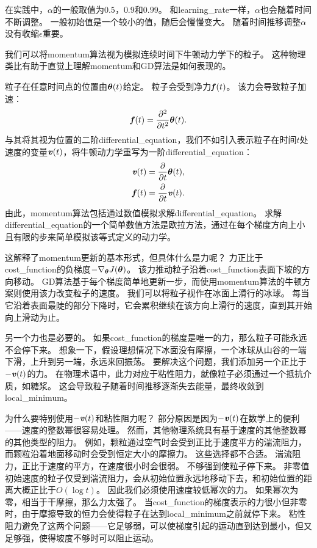 
在实践中，$\alpha$的一般取值为$0.5$，$0.9$和$0.99$。
和\gls{learning_rate}一样，$\alpha$也会随着时间不断调整。 
一般初始值是一个较小的值，随后会慢慢变大。
随着时间推移调整$\alpha$没有收缩$\epsilon$重要。


我们可以将\gls{momentum}算法视为模拟连续时间下牛顿动力学下的粒子。
这种物理类比有助于直觉上理解\gls{momentum}和\gls{GD}算法是如何表现的。


粒子在任意时间点的位置由$\boldsymbol{\theta}(t)$给定。
粒子会受到净力$\boldsymbol{\mathit{f}}(t)$。
该力会导致粒子加速：
\begin{equation}
    \boldsymbol{\mathit{f}}(t) = \frac{\partial^2}{\partial t^2} \boldsymbol{\theta}(t) .
\end{equation}
与其将其视为位置的二阶\gls{differential_equation}，我们不如引入表示粒子在时间$t$处速度的变量$\boldsymbol{\mathit{v}}(t)$，将牛顿动力学重写为一阶\gls{differential_equation}：
\begin{align}
    \boldsymbol{\mathit{v}}(t) &= \frac{\partial}{\partial t} \boldsymbol{\theta}(t) , \\
    \boldsymbol{\mathit{f}}(t) &= \frac{\partial}{\partial t} \boldsymbol{\mathit{v}}(t) .
\end{align}
由此，\gls{momentum}算法包括通过数值模拟求解\gls{differential_equation}。
求解\gls{differential_equation}的一个简单数值方法是欧拉方法，通过在每个梯度方向上小且有限的步来简单模拟该等式定义的动力学。


这解释了\gls{momentum}更新的基本形式，但具体什么是力呢？
力正比于\gls{cost_function}的负梯度$-\nabla_{\boldsymbol{\theta}} J(\boldsymbol{\theta})$。
该力推动粒子沿着\gls{cost_function}表面下坡的方向移动。
\gls{GD}算法基于每个梯度简单地更新一步，而使用\gls{momentum}算法的牛顿方案则使用该力改变粒子的速度。
我们可以将粒子视作在冰面上滑行的冰球。
每当它沿着表面最陡的部分下降时，它会累积继续在该方向上滑行的速度，直到其开始向上滑动为止。


另一个力也是必要的。
如果\gls{cost_function}的梯度是唯一的力，那么粒子可能永远不会停下来。
想象一下，假设理想情况下冰面没有摩擦，一个冰球从山谷的一端下滑，上升到另一端，永远来回振荡。
要解决这个问题，我们添加另一个正比于$-\boldsymbol{\mathit{v}}(t)$的力。
在物理术语中，此力对应于粘性阻力，就像粒子必须通过一个抵抗介质，如糖浆。
这会导致粒子随着时间推移逐渐失去能量，最终收敛到\gls{local_minimum}。


为什么要特别使用$-\boldsymbol{\mathit{v}}(t)$和粘性阻力呢？
部分原因是因为$-\boldsymbol{\mathit{v}}(t)$在数学上的便利——速度的整数幂很容易处理。
然而，其他物理系统具有基于速度的其他整数幂的其他类型的阻力。
例如，颗粒通过空气时会受到正比于速度平方的湍流阻力，而颗粒沿着地面移动时会受到恒定大小的摩擦力。
这些选择都不合适。
湍流阻力，正比于速度的平方，在速度很小时会很弱。
不够强到使粒子停下来。
非零值初始速度的粒子仅受到湍流阻力，会从初始位置永远地移动下去，和初始位置的距离大概正比于$O(\log t)$。
因此我们必须使用速度较低幂次的力。
如果幂次为零，相当于干摩擦，那么力太强了。
当\gls{cost_function}的梯度表示的力很小但非零时，由于摩擦导致的恒力会使得粒子在达到\gls{local_minimum}之前就停下来。
粘性阻力避免了这两个问题——它足够弱，可以使梯度引起的运动直到达到最小，但又足够强，使得坡度不够时可以阻止运动。


